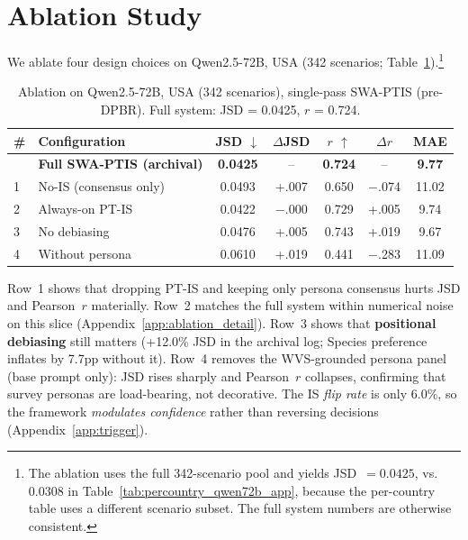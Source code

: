 \documentclass{article}
\newcommand{\gain}[1]{\textcolor{improvegreen}{#1}}
\newcommand{\loss}[1]{\textcolor{worsered}{#1}}
\begin{document}
\section{Ablation Study}
\label{sec:ablation}

We ablate four design choices on Qwen2.5-72B, USA (342 scenarios;
Table~\ref{tab:ablation}).\footnote{The ablation uses the full 342-scenario
pool and yields JSD~$=0.0425$, vs.\ $0.0308$ in
Table~\ref{tab:percountry_qwen72b_app}, because the per-country table uses a
different scenario subset. The full system numbers are otherwise
consistent.}

\begin{table}[t]
\caption{Ablation on Qwen2.5-72B, USA (342 scenarios), single-pass SWA-PTIS
(pre-DPBR). Full system: JSD = 0.0425, $r$ = 0.724.}
\label{tab:ablation}
\centering\small
\setlength{\tabcolsep}{4pt}
\begin{tabular}{llccccc}
\toprule
\# & Configuration & JSD $\downarrow$ & $\Delta$JSD & $r$ $\uparrow$ & $\Delta r$ & MAE \\
\midrule
  & \textbf{Full SWA-PTIS (archival)} & \textbf{0.0425} & -- & \textbf{0.724} & -- & \textbf{9.77} \\
\midrule
1 & No-IS (consensus only)            & 0.0493 & \loss{+.007} & 0.650 & \loss{$-$.074} & 11.02 \\
2 & Always-on PT-IS                   & 0.0422 & \gain{$-$.000} & 0.729 & \gain{+.005} & 9.74 \\
3 & No debiasing                     & 0.0476 & \loss{+.005} & 0.743 & +.019         & 9.67 \\
4 & Without persona                  & 0.0610 & \loss{+.019} & 0.441 & \loss{$-$.283} & 11.09 \\
\bottomrule
\end{tabular}
\end{table}

Row~1 shows that dropping PT-IS and keeping only persona consensus hurts JSD and
Pearson~$r$ materially. Row~2 matches the full system within numerical noise on this
slice (Appendix~\ref{app:ablation_detail}). Row~3 shows that \textbf{positional
debiasing} still matters (+12.0\% JSD in the archival log; Species preference
inflates by 7.7pp without it). Row~4 removes the WVS-grounded persona panel (base
prompt only): JSD rises sharply and Pearson~$r$ collapses, confirming that survey
personas are load-bearing, not decorative. The IS \emph{flip rate} is only 6.0\%,
so the framework \emph{modulates confidence} rather than reversing decisions
(Appendix~\ref{app:trigger}).
\end{document}
